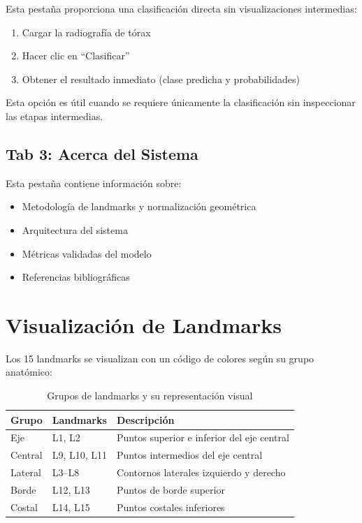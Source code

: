 Esta pestaña proporciona una clasificación directa sin visualizaciones intermedias:

\begin{enumerate}
    \item Cargar la radiografía de tórax
    \item Hacer clic en ``Clasificar''
    \item Obtener el resultado inmediato (clase predicha y probabilidades)
\end{enumerate}

Esta opción es útil cuando se requiere únicamente la clasificación sin inspeccionar las etapas intermedias.

\subsection{Tab 3: Acerca del Sistema}

Esta pestaña contiene información sobre:
\begin{itemize}
    \item Metodología de landmarks y normalización geométrica
    \item Arquitectura del sistema
    \item Métricas validadas del modelo
    \item Referencias bibliográficas
\end{itemize}

\section{Visualización de Landmarks}

Los 15 landmarks se visualizan con un código de colores según su grupo anatómico:

\begin{table}[H]
\centering
\begin{tabular}{llp{6cm}}
\toprule
\textbf{Grupo} & \textbf{Landmarks} & \textbf{Descripción} \\
\midrule
Eje & L1, L2 & Puntos superior e inferior del eje central \\
Central & L9, L10, L11 & Puntos intermedios del eje central \\
Lateral & L3--L8 & Contornos laterales izquierdo y derecho \\
Borde & L12, L13 & Puntos de borde superior \\
Costal & L14, L15 & Puntos costales inferiores \\
\bottomrule
\end{tabular}
\caption{Grupos de landmarks y su representación visual}
\end{table}

